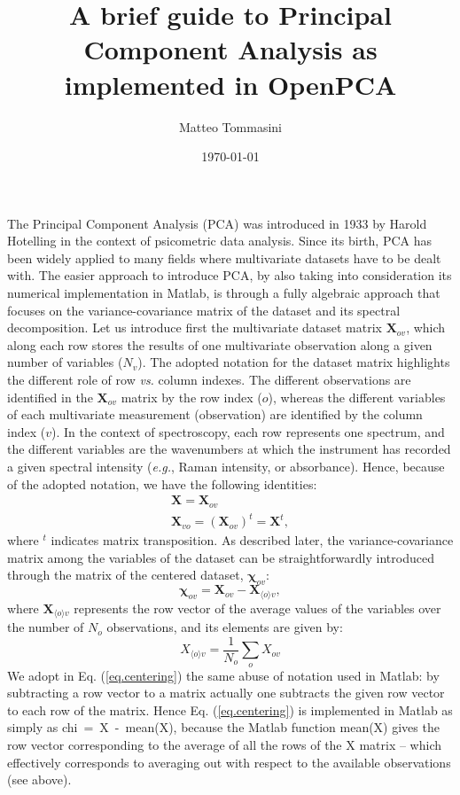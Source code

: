 \documentclass[11pt]{amsart}
\title{A brief guide to Principal Component Analysis as implemented in OpenPCA}
\author{Matteo Tommasini}
\date{\today}
\begin{document}
\maketitle

%
The Principal Component Analysis (PCA) was introduced in 1933 by Harold Hotelling \cite{Hotelling1933} in the context of psicometric data analysis. Since its birth, PCA has been widely applied to many fields where multivariate datasets have to be dealt with.
The easier approach to introduce PCA, by also taking into consideration its numerical implementation in Matlab, is through a fully algebraic approach that focuses on the variance-covariance matrix of the dataset and its spectral decomposition.
%
Let us introduce first the multivariate dataset matrix $\bm X_{ov}$, which along each row stores the results of one multivariate observation along a given number of variables ($N_v$). The adopted notation for the dataset matrix highlights the different role of row {\it vs.} column indexes. The different observations are identified in the $\bm X_{ov}$ matrix by the row index ($o$), whereas the different variables of each multivariate measurement (observation) are identified by the column index ($v$). In the context of spectroscopy, each row represents one spectrum, and the different variables are the wavenumbers at which the instrument has recorded a given spectral intensity ({\it e.g.}, Raman intensity, or absorbance). Hence, because of the adopted notation, we have the following identities:
%
\begin{eqnarray}
\bm X = \bm X_{ov}
\\ \nonumber
\bm X_{vo} = \left( \bm X_{ov} \right)^t = \bm X^t,
\end{eqnarray}
%
where $^t$ indicates matrix transposition. As described later, the variance-covariance matrix among the variables of the dataset can be straightforwardly introduced through the matrix of the centered dataset, $\bm \chi_{ov}$:
%
\begin{equation}
\label{eq.centering}
\bm \chi_{ov} = \bm X_{ov} -  \bm X_{\langle o \rangle v},
\end{equation}
%
where $\bm X_{\langle o \rangle v}$ represents the row vector of the average values of the variables over the number of $N_o$ observations, and its elements are given by:
%
\begin{equation}
\label{eq.average}
X_{\langle o \rangle v} = \frac{1}{N_o} \sum_{o} X_{ov} 
\end{equation}
%
We adopt in Eq. (\ref{eq.centering}) the same abuse of notation used in Matlab: by subtracting a row vector to a matrix actually one subtracts the given row vector to each row of the matrix. Hence Eq. (\ref{eq.centering}) is implemented in Matlab as simply as \mbox{chi = X - mean(X)}, because the Matlab function mean(X) gives the row vector corresponding to the average of all the rows of the X matrix -- which effectively corresponds to averaging out with respect to the available observations (see above).
\end{document}
